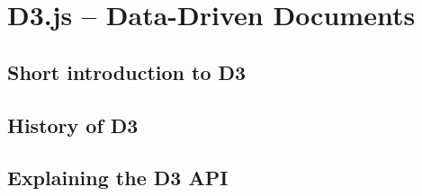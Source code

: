 \chapter{D3.js – Data-Driven Documents}
\label{cha:d3js}

\section{Short introduction to D3}

\section{History of D3}

\section{Explaining the D3 API}
